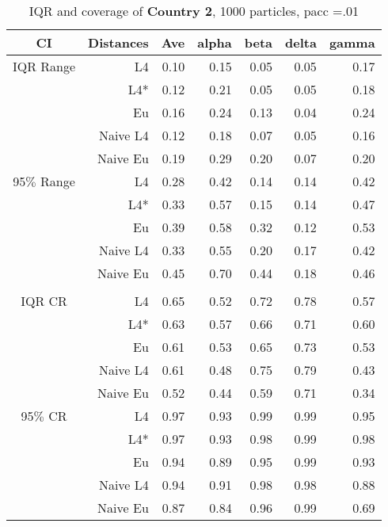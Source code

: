 \documentclass[a4paper,12pt,twoside]{book}
\begin{document}
\begin{table}[H]
\centering
\caption{IQR and coverage of \textbf{Country 2}, 1000 particles, pacc =.01}

\begin{tabular}{crrrrrr}
  \hline
{\color{blue}CI} & Distances & Ave & alpha & beta & delta & gamma \\ 
  \hline
{\color{blue}IQR Range}& L4  &0.10 & 0.15 & 0.05 & 0.05 & 0.17 \\ 
  
 &L4*  &0.12 & 0.21 & 0.05 & 0.05 & 0.18 \\ 
 
&Eu &      0.16 & 0.24 & 0.13 & 0.04 & 0.24 \\ 
 
&Naive L4& 0.12 & 0.18 & 0.07 & 0.05 & 0.16 \\ 
  
&Naive Eu &   0.19 & 0.29 & 0.20 & 0.07 & 0.20 \\ 
   
    {\color{blue}95$\%$ Range} & L4  &0.28 & 0.42 & 0.14 & 0.14 & 0.42 \\ 
 
    &L4*  &  0.33 & 0.57 & 0.15 & 0.14 & 0.47 \\ 
  
&Eu &  0.39 & 0.58 & 0.32 & 0.12 & 0.53 \\ 
  
&Naive L4&   0.33 & 0.55 & 0.20 & 0.17 & 0.42 \\ 
&Naive Eu &    0.45 & 0.70 & 0.44 & 0.18 & 0.46 \\ 
  
     \\
   \hline
   
{\color{blue} IQR CR } & L4  &0.65 & 0.52 & 0.72 & 0.78 & 0.57 \\ 
  
&L4*  & 0.63 & 0.57 & 0.66 & 0.71 & 0.60 \\ 
  
&Eu &   0.61 & 0.53 & 0.65 & 0.73 & 0.53 \\ 
  
&Naive L4&  0.61 & 0.48 & 0.75 & 0.79 & 0.43 \\ 
  
&Naive Eu &  0.52 & 0.44 & 0.59 & 0.71 & 0.34 \\ 
  

 {\color{blue} 95$\%$ CR } & L4  &0.97 & 0.93 & 0.99 & 0.99 & 0.95 \\ 
 
 &L4*  &   0.97 & 0.93 & 0.98 & 0.99 & 0.98 \\ 
   
&Eu &   0.94 & 0.89 & 0.95 & 0.99 & 0.93 \\ 
  
&Naive L4&  
  0.94 & 0.91 & 0.98 & 0.98 & 0.88 \\
&Naive Eu &     0.87 & 0.84 & 0.96 & 0.99 & 0.69 \\ 
\end{tabular}

\end{table}
\end{document}
